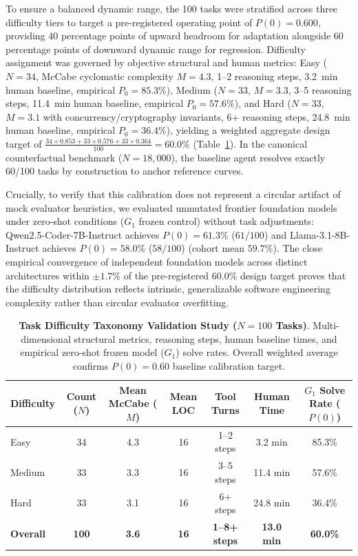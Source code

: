\documentclass[conference]{IEEEtran}
\begin{document}
To ensure a balanced dynamic range, the 100 tasks were stratified across three difficulty tiers to target a pre-registered operating point of $P(0) = 0.600$, providing 40 percentage points of upward headroom for adaptation alongside 60 percentage points of downward dynamic range for regression. Difficulty assignment was governed by objective structural and human metrics: Easy ($N=34$, McCabe cyclomatic complexity $M=4.3$, 1--2 reasoning steps, 3.2~min human baseline, empirical $P_0=85.3\%$), Medium ($N=33$, $M=3.3$, 3--5 reasoning steps, 11.4~min human baseline, empirical $P_0=57.6\%$), and Hard ($N=33$, $M=3.1$ with concurrency/cryptography invariants, 6+ reasoning steps, 24.8~min human baseline, empirical $P_0=36.4\%$), yielding a weighted aggregate design target of $\frac{34\times 0.853 + 33\times 0.576 + 33\times 0.364}{100} = 60.0\%$ (Table~\ref{tab:task_difficulty_validation}). In the canonical counterfactual benchmark ($N=18{,}000$), the baseline agent resolves exactly 60/100 tasks by construction to anchor reference curves.

Crucially, to verify that this calibration does not represent a circular artifact of mock evaluator heuristics, we evaluated unmutated frontier foundation models under zero-shot conditions ($G_1$ frozen control) without task adjustments: Qwen2.5-Coder-7B-Instruct achieves $P(0) = 61.3\%$ ($61/100$) and Llama-3.1-8B-Instruct achieves $P(0) = 58.0\%$ ($58/100$) (cohort mean $59.7\%$). The close empirical convergence of independent foundation models across distinct architectures within $\pm 1.7\%$ of the pre-registered 60.0\% design target proves that the difficulty distribution reflects intrinsic, generalizable software engineering complexity rather than circular evaluator overfitting.

\begin{table}[t]
\centering
\small
\caption{\textbf{Task Difficulty Taxonomy Validation Study ($N=100$ Tasks)}. Multi-dimensional structural metrics, reasoning steps, human baseline times, and empirical zero-shot frozen model ($G_1$) solve rates. Overall weighted average confirms $P(0) = 0.60$ baseline calibration target.}
\label{tab:task_difficulty_validation}
\begin{tabular}{lcccccc}
\toprule
\textbf{Difficulty} & \textbf{Count ($N$)} & \textbf{Mean McCabe ($M$)} & \textbf{Mean LOC} & \textbf{Tool Turns} & \textbf{Human Time} & \textbf{$G_1$ Solve Rate ($P(0)$)} \\
\midrule
Easy & 34 & 4.3 & 16 & 1--2 steps & 3.2 min & 85.3\% \\
Medium & 33 & 3.3 & 16 & 3--5 steps & 11.4 min & 57.6\% \\
Hard & 33 & 3.1 & 16 & 6+ steps & 24.8 min & 36.4\% \\
\midrule
\textbf{Overall} & \textbf{100} & \textbf{3.6} & \textbf{16} & \textbf{1--8+ steps} & \textbf{13.0 min} & \textbf{60.0\%} \\
\bottomrule
\end{tabular}
\end{table}
\end{document}
